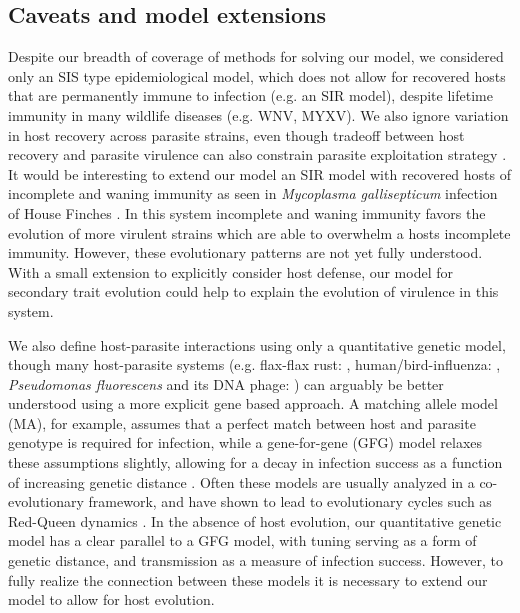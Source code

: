 \subsection*{Caveats and model extensions}

Despite our breadth of coverage of methods for solving our model, we considered only an SIS type  epidemiological model, which does not allow for recovered hosts that are permanently immune to infection (e.g. an SIR model), despite lifetime immunity in many wildlife diseases (e.g. WNV, MYXV). We also ignore variation in host recovery across parasite strains, even though tradeoff between host recovery and parasite virulence can also constrain parasite exploitation strategy \citep{Alizon2008}. It would be interesting to extend our model an SIR model with recovered hosts of incomplete and waning immunity as seen in \emph{Mycoplasma gallisepticum} infection of House Finches \citep{Flemingetal.2018}. In this system incomplete and waning immunity favors the evolution of more virulent strains which are able to overwhelm a hosts incomplete immunity. However, these evolutionary patterns are not yet fully understood. With a small extension to explicitly consider host defense, our model for secondary trait evolution could help to explain the evolution of virulence in this system. 

We also define host-parasite interactions using only a quantitative genetic model, though many host-parasite systems (e.g. flax-flax rust: \citealt{IslamandShepherd1991}, human/bird-influenza: \citealt{Smithetal.2004, PoullainandNuismer2012}, \emph{Pseudomonas fluorescens} and its DNA phage: \citealt{Poullainetal.2008}) can arguably be better understood using a more explicit gene based approach. A matching allele model (MA), for example, assumes that a perfect match between host and parasite genotype is required for infection, while a gene-for-gene (GFG) model relaxes these assumptions slightly, allowing for a decay in infection success as a function of increasing genetic distance \citep{AgrawalandLively2002, NuismerandOtto2005, Thralletal.2016}. Often these models are usually analyzed in a co-evolutionary framework, and have shown to lead to evolutionary cycles such as Red-Queen dynamics \citep{Decaesteckeretal.2007}. In the absence of host evolution, our quantitative genetic model has a clear parallel to a GFG model, with tuning serving as a form of genetic distance, and transmission as a measure of infection success. However, to fully realize the connection between these models it is necessary to extend our model to allow for host evolution.

